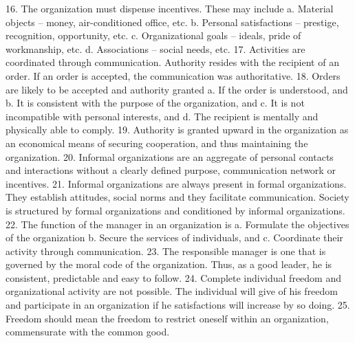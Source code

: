     16. The organization must dispense incentives. These may include
        a. Material objects – money, air-conditioned office, etc.
        b. Personal satisfactions – prestige, recognition, opportunity, etc.
        c. Organizational goals – ideals, pride of workmanship, etc.
        d. Associations – social needs, etc.
    17. Activities are coordinated through communication. Authority resides with the recipient of an order. If an order is accepted, the communication was authoritative.
    18. Orders are likely to be accepted and authority granted
        a. If the order is understood, and
        b. It is consistent with the purpose of the organization, and
        c. It is not incompatible with personal interests, and
        d. The recipient is mentally and physically able to comply.
    19. Authority is granted upward in the organization as an economical means of securing cooperation, and thus maintaining the organization.
    20. Informal organizations are an aggregate of personal contacts and interactions without a clearly defined purpose, communication network or incentives.
    21. Informal organizations are always present in formal organizations. They establish attitudes, social norms and they facilitate communication. Society is structured by formal organizations and conditioned by informal organizations.
    22. The function of the manager in an organization is
        a. Formulate the objectives of the organization
        b. Secure the services of individuals, and 
        c. Coordinate their activity through communication.
    23. The responsible manager is one that is governed by the moral code of the organization. Thus, as a good leader, he is consistent, predictable and easy to follow.
    24. Complete individual freedom and organizational activity are not possible. The individual will give of his freedom and participate in an organization if he satisfactions will increase by so doing.
    25. Freedom should mean the freedom to restrict oneself within an organization, commensurate with the common good.